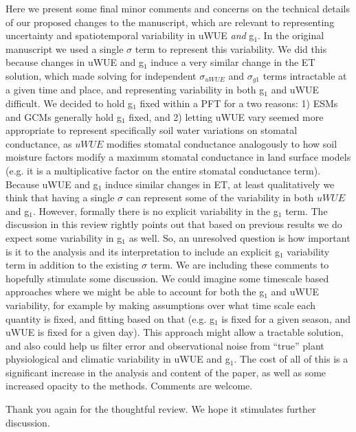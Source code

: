 Here we present some final minor comments and concerns on the
technical details of our proposed changes to the manuscript, which are
relevant to representing uncertainty and spatiotemporal variability in
uWUE \textit{and} g$_1$. In the original manuscript we used a single
$\sigma$ term to represent this variability. We did this because
changes in uWUE and g$_1$ induce a very similar change in the ET
solution, which made solving for independent $\sigma_{uWUE}$ and
$\sigma_{g1}$ terms intractable at a given time and place, and
representing variability in both g$_1$ and uWUE difficult. We decided
to hold g$_1$ fixed within a PFT for a two reasons: 1) ESMs and GCMs
generally hold g$_1$ fixed, and 2) letting uWUE vary seemed more
appropriate to represent specifically soil water variations on
stomatal conductance, as $uWUE$ modifies stomatal conductance
analogously to how soil moisture factors modify a maximum stomatal
conductance in land surface models (e.g. it is a multiplicative factor
on the entire stomatal conductance term). Because uWUE and g$_1$
induce similar changes in ET, at least qualitatively we think that
having a single $\sigma$ can represent some of the variability in both
$uWUE$ and g$_1$. However, formally there is no explicit variability
in the g$_1$ term. The discussion in this review rightly points out
that based on previous results we do expect some variability in g$_1$
as well. So, an unresolved question is how important is it to the
analysis and its interpretation to include an explicit g$_1$
variability term in addition to the existing $\sigma$ term. We are
including these comments to hopefully stimulate some discussion. We
could imagine some timescale based approaches where we might be able
to account for both the g$_1$ and uWUE variability, for example by
making assumptions over what time scale each quantity is fixed, and
fitting based on that (e.g. g$_1$ is fixed for a given season, and
uWUE is fixed for a given day). This approach might allow a tractable
solution, and also could help us filter error and observational noise
from ``true'' plant physiological and climatic variability in uWUE and
g$_1$. The cost of all of this is a significant increase in the
analysis and content of the paper, as well as some increased opacity
to the methods. Comments are welcome.

Thank you again for the thoughtful review. We hope it stimulates
further discussion.


